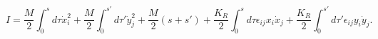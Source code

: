 \begin{equation}
\label{2daction}
I=\frac{M}{2}\int_0^{s}d\tau \dot{x}_i^2+\frac{M}{2}\int_0^{s'}d\tau '\dot{y}_j^2+\frac{M}{2}(s+s')+\frac{K_R}{2}\int_0^s d\tau \epsilon_{ij}x_i\dot{x}_j+\frac{K_R}{2}\int_0^{s'} d\tau ' \epsilon_{ij}y_i\dot{y}_j.
\end{equation}

